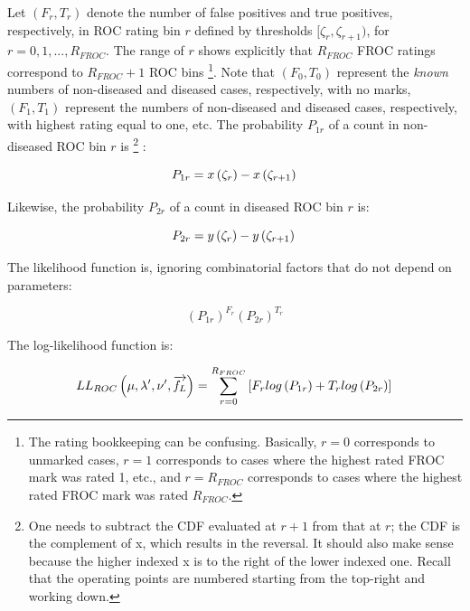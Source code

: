 \documentclass[
]{book}
\begin{document}
Let \((F_r,T_r)\) denote the number of false positives and true positives, respectively, in ROC rating bin \(r\) defined by thresholds \([\zeta_r, \zeta_{r+1})\), for \(r = 0, 1, ..., R_{FROC}\). The range of \(r\) shows explicitly that \(R_{FROC}\) FROC ratings correspond to \(R_{FROC}+1\) ROC bins \footnote{The rating bookkeeping can be confusing. Basically, \(r = 0\) corresponds to unmarked cases, \(r = 1\) corresponds to cases where the highest rated FROC mark was rated 1, etc., and \(r = R_{FROC}\) corresponds to cases where the highest rated FROC mark was rated \(R_{FROC}\).}. Note that \((F_0,T_0)\) represent the \emph{known} numbers of non-diseased and diseased cases, respectively, with no marks, \((F_1,T_1)\) represent the numbers of non-diseased and diseased cases, respectively, with highest rating equal to one, etc. The probability \(P_{1r}\) of a count in non-diseased ROC bin \(r\) is \footnote{One needs to subtract the CDF evaluated at \(r+1\) from that at \(r\); the CDF is the complement of x, which results in the reversal. It should also make sense because the higher indexed x is to the right of the lower indexed one. Recall that the operating points are numbered starting from the top-right and working down.} :

\begin{equation}
P_{1r} = x\left ( \zeta_r \right ) - x\left ( \zeta_{r+1} \right )\\ 
\label{eq:rsm-fitting-roc-p1r}
\end{equation}

Likewise, the probability \(P_{2r}\) of a count in diseased ROC bin \(r\) is:

\begin{equation}
P_{2r} = y\left ( \zeta_r \right ) - y\left ( \zeta_{r+1} \right )\\ 
\label{eq:rsm-fitting-roc-p2r}
\end{equation}

The likelihood function is, ignoring combinatorial factors that do not depend on parameters:

\[\left ( P_{1r} \right )^{F_r}  \left ( P_{2r} \right )^{T_r}\]

The log-likelihood function is:

\begin{equation}
LL_{ROC} \left ( \mu, \lambda', \nu', \overrightarrow{f_L} \right )= \sum_{r=0}^{R_{FROC}} \left [F_r log \left (P_{1r}  \right ) + T_r log \left (P_{2r}  \right )  \right ] \\
\label{eq:rsm-fitting-roc-ll2}
\end{equation}
\end{document}
